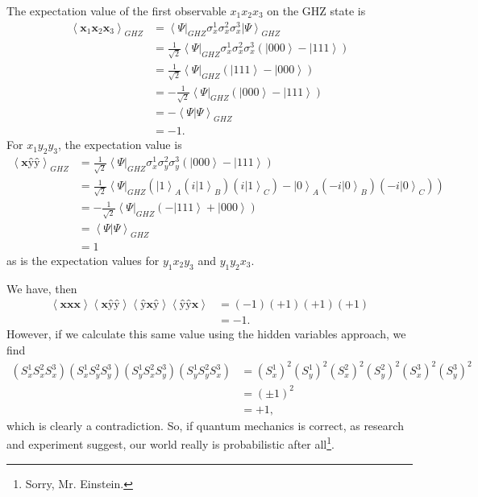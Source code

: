 \documentclass[11pt]{article} %
\newcommand{\bra}[1]{\left\langle #1 \right|}
\newcommand{\ket}[1]{\left|#1\right\rangle}
\newcommand{\braket}[2]{\left\langle#1 |  #2\right\rangle}
\begin{document}
The expectation value of the first observable $x_1x_2x_3$ on the GHZ state is
\begin{align}
    \left<\textbf{\^x}_1\textbf{\^x}_2\textbf{\^x}_3\right>_{GHZ} &= \bra{\Psi}_{GHZ}\sigma^1_x\sigma^2_x\sigma^3_x\ket{\Psi}_{GHZ}\\
    &= \frac{1}{\sqrt{2}}\bra{\Psi}_{GHZ}\sigma^1_x\sigma^2_x\sigma^3_x\left(\ket{000} - \ket{111}\right)\nonumber\\
    &= \frac{1}{\sqrt{2}}\bra{\Psi}_{GHZ}\left(\ket{111} - \ket{000}\right)\nonumber\\
    &= -\frac{1}{\sqrt{2}}\bra{\Psi}_{GHZ}\left(\ket{000} - \ket{111}\right)\nonumber\\
    &= -\braket{\Psi}{\Psi}_{GHZ}\nonumber\\
    &= -1.
\end{align}
For $x_1y_2y_3$, the expectation value is
\begin{align}
    \left<\textbf{\^x}\textbf{\^y}\textbf{\^y}\right>_{GHZ} &= \frac{1}{\sqrt{2}}\bra{\Psi}_{GHZ}\sigma^1_x\sigma^2_y\sigma^3_y\left(\ket{000} - \ket{111}\right)\nonumber\\
    &= \frac{1}{\sqrt{2}}\bra{\Psi}_{GHZ}\left(\ket{1}_A\left(i\ket{1}_B\right)\left(i\ket{1}_C\right) - \ket{0}_A\left(-i\ket{0}_B\right)\left(-i\ket{0}_C\right)\right)\nonumber\\
    &= -\frac{1}{\sqrt{2}}\bra{\Psi}_{GHZ}\left(-\ket{111} + \ket{000}\right)\nonumber\\
    &= \braket{\Psi}{\Psi}_{GHZ}\nonumber\\
    &= 1
\end{align}
as is the expectation values for $y_1x_2y_3$ and $y_1y_2x_3$.

We have, then
\begin{align}
    \left<\textbf{\^x}\textbf{\^x}\textbf{\^x}\right>\left<\textbf{\^x}\textbf{\^y}\textbf{\^y}\right>\left<\textbf{\^y}\textbf{\^x}\textbf{\^y}\right>\left<\textbf{\^y}\textbf{\^y}\textbf{\^x}\right> &= (-1)(+1)(+1)(+1)\nonumber\\
    &= -1.
\end{align}
However, if we calculate this same value using the hidden variables approach, we find
\begin{align}
    \left(S^1_xS^2_xS^3_x\right)\left(S^1_xS^2_yS^3_y\right)\left(S^1_yS^2_xS^3_y\right)\left(S^1_yS^2_yS^3_x\right) &= \left(S^1_x\right)^2\left(S^1_y\right)^2\left(S^2_x\right)^2\left(S^2_y\right)^2\left(S^3_x\right)^2\left(S^3_y\right)^2\nonumber\\
    &= (\pm1)^2\nonumber\\
    &= +1,
\end{align}
which is clearly a contradiction. So, if quantum mechanics is correct, as research and experiment suggest, our world really is probabilistic after all\footnote{Sorry, Mr. Einstein.}.
\end{document}
